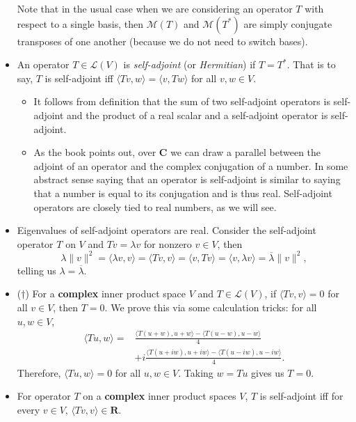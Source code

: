 \documentclass[11pt]{article}
\newcommand{\df}[1]{\textit{\textsf{#1}}}
\newcommand{\R}{\mathbf{R}}
\newcommand{\C}{\mathbf{C}}
\newcommand{\conj}[1]{\overline{#1}}
\newcommand{\inp}[2]{\langle #1, #2 \rangle}
\newcommand{\nm}[1]{\lVert #1 \rVert}
\newcommand{\LV}{\mathcal{L}(V)}
\newcommand{\M}{\mathcal{M}}
\begin{document}
\begin{itemize}
    Note that in the usual case when we are considering an operator $T$ with respect to a single basis, then $\M(T)$ and $\M(T^*)$ are simply conjugate transposes of one another (because we do not need to switch bases).
    \item An operator $T \in \LV$ is \df{self-adjoint} (or \df{Hermitian}) if $T=T^*$. That is to say, $T$ is self-adjoint iff $\inp{Tv}{w}=\inp{v}{Tw}$ for all $v,w \in V$.
    \begin{itemize}
        \item It follows from definition that the sum of two self-adjoint operators is self-adjoint and the product of a real scalar and a self-adjoint operator is self-adjoint.
        \item As the book points out, over $\C$ we can draw a parallel between the adjoint of an operator and the complex conjugation of a number. In some abstract sense saying that an operator is self-adjoint is similar to saying that a number is equal to its conjugation and is thus real. Self-adjoint operators are closely tied to real numbers, as we will see.
    \end{itemize}
    \item Eigenvalues of self-adjoint operators are real. Consider the self-adjoint operator $T$ on $V$ and $Tv = \lambda v$ for nonzero $v \in V$, then $$\lambda \nm{v}^2 = \inp{\lambda v}{v} = \inp{Tv}{v} = \inp{v}{Tv} = \inp{v}{\lambda v} = \conj{\lambda}\nm{v}^2,$$ telling us $\lambda = \conj{\lambda}$.
    \item ($\dagger$) For a \textbf{complex} inner product space $V$ and $T \in \LV$, if $\inp{Tv}{v}=0$ for all $v \in V$, then $T = 0$. We prove this via some calculation tricks: for all $u,w \in V$,
    \begin{align*}
        \inp{Tu}{w} = & \frac{\inp{T(u+w)}{u+w} - \inp{T(u-w)}{u-w}}{4} \\ & + i \frac{\inp{T(u+iw)}{u+iw} - \inp{T(u-iw)}{u-iw}}{4}.
    \end{align*}
    Therefore, $\inp{Tu}{w} = 0$ for all $u,w \in V$. Taking $w = Tu$ gives us $T = 0$.
    \item For operator $T$ on a \textbf{complex} inner product spaces $V$, $T$ is self-adjoint iff for every $v \in V$, $\inp{Tv}{v} \in \R$.
    

\end{itemize}
\end{document}
